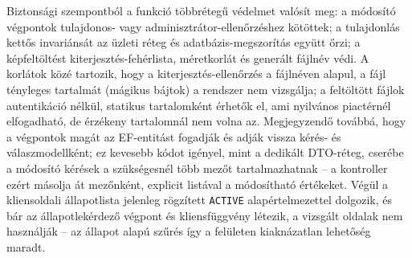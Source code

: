 Biztonsági szempontból a funkció többrétegű védelmet valósít meg: a módosító végpontok
tulajdonos- vagy adminisztrátor-ellenőrzéshez kötöttek; a tulajdonlás kettős invariánsát az
üzleti réteg és adatbázis-megszorítás együtt őrzi; a képfeltöltést kiterjesztés-fehérlista,
méretkorlát és generált fájlnév védi. A korlátok közé tartozik, hogy a kiterjesztés-ellenőrzés a
fájlnéven alapul, a fájl tényleges tartalmát (mágikus bájtok) a rendszer nem vizsgálja; a
feltöltött fájlok autentikáció nélkül, statikus tartalomként érhetők el, ami nyilvános piactérnél
elfogadható, de érzékeny tartalomnál nem volna az. Megjegyzendő továbbá, hogy a végpontok magát az
EF-entitást fogadják és adják vissza kérés- és válaszmodellként; ez kevesebb kódot igényel, mint a
dedikált DTO-réteg, cserébe a módosító kérések a szükségesnél több mezőt tartalmazhatnak -- a
kontroller ezért másolja át mezőnként, explicit listával a módosítható értékeket. Végül a
kliensoldali állapotlista jelenleg rögzített \texttt{ACTIVE} alapértelmezettel dolgozik, és bár az
állapotlekérdező végpont és kliensfüggvény létezik, a vizsgált oldalak nem használják -- az
állapot alapú szűrés így a felületen kiaknázatlan lehetőség maradt.
